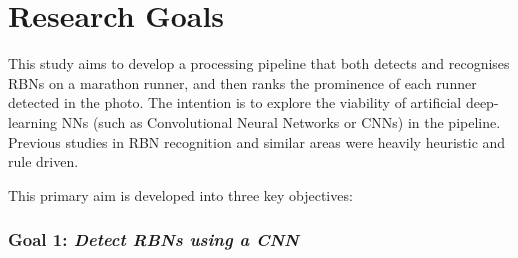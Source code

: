 \section{Research Goals}
\label{sec:introduction:research_goals}

This study aims to develop a processing pipeline that both detects and recognises RBNs on a marathon runner, and then ranks the prominence of each runner detected in the photo. The intention is to explore the viability of artificial deep-learning NNs (such as Convolutional Neural Networks or CNNs) in the pipeline. Previous studies in RBN recognition \citep{Benami:2012jf} and similar areas \citep{Kundu:2015vq, Eichner:2008dw, Torresen:2004jl} were heavily heuristic and rule driven.

This primary aim is developed into three key objectives:




\subsubsection*{Goal 1: \itshape Detect RBNs using a CNN}

